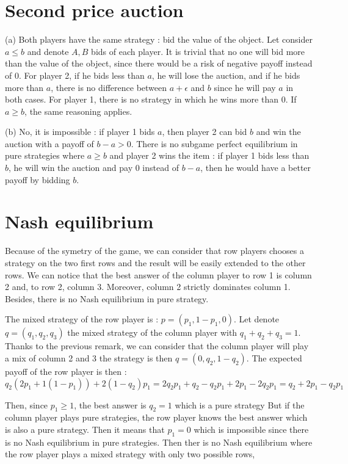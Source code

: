 \documentclass[11pt, a4paper]{article}
\begin{document}
\section{Second price auction}

(a) Both players have the same strategy : bid the value
 of the object. Let consider $a \leq b$ and denote $A,  B$ bids of each player. It is trivial that no one will bid more than the value of the object, 
 since there would be a risk of negative payoff instead of 0. For player 2, if he bids less than $a$, he will lose the auction, and if he bids more than $a$, there is no difference between $a + \epsilon $ and $b$ 
 since he will pay $a$ in both cases. For player 1, there is no strategy in which he wins more than 0. 
 If $a \geq b$, the same reasoning applies.
\newline

(b) No, it is impossible : if player 1 bids $a$, then  player 2 can bid $b$ and win the auction with a payoff of $b - a > 0$.
There is no subgame perfect equilibrium in pure strategies where  $ a \geq b$ and player 2 wins the item : if player 1 bids less than
    $b$, he will win the auction and pay $0$ instead of $b - a$, then he would have a better payoff by bidding $b$.


\section{Nash equilibrium}
Because of the symetry of the game, we can consider that row players chooses a strategy on the two first rows and the result will be 
easily extended to the other rows. We can notice that the best answer of the column player to row 1 is column 2 and, to row 2, column 3. Moreover,
 column 2 strictly dominates column 1.
Besides, there is no Nash equilibrium in pure strategy.


The mixed strategy of the row player is : $p = (p_1, 1 - p_1, 0)$.
Let denote $q = (q_1, q_2, q_3)$ the mixed strategy of the column player with $q_1 + q_2 + q_3 = 1$. Thanks to the previous
 remark, we can consider that the column player will play a mix of column 2 and 3 the strategy is then $q = (0, q_2, 1-q_2)$. The expected payoff of the row player is then :
$$
q_2(2 p_1 + 1 (1-p_1)) + 2(1-q_2) p_1 = 2q_2 p_1 + q_2 - q_2 p_1  +2p_1 - 2q_2 p_1 = q_2 + 2p_1 - q_2 p_1
$$

Then, since $ p_1 \geq 1$, the best answer is $q_2 = 1$ which is a pure strategy 
But if the column player plays pure strategies, the row player knows the best answer which is also a pure strategy. Then it means that $ p_1 =0 $ which is impossible since  there is no Nash equilibrium in pure strategies. Then ther is no Nash equilibrium 
where the row player plays a mixed strategy with only two possible rows, 
\end{document}

